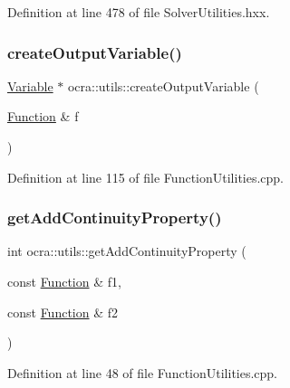 Definition at line 478 of file Solver\+Utilities.\+hxx.

\hypertarget{namespaceocra_1_1utils_ab8a4ac5aa3bfae2c0732c7abd21a84c9}{}\label{namespaceocra_1_1utils_ab8a4ac5aa3bfae2c0732c7abd21a84c9} 
\subsubsection{\texorpdfstring{create\+Output\+Variable()}{createOutputVariable()}}
{\footnotesize\ttfamily \hyperlink{classocra_1_1Variable}{Variable} $\ast$ ocra\+::utils\+::create\+Output\+Variable (\begin{DoxyParamCaption}\item[{\hyperlink{classocra_1_1Function}{Function} \&}]{f }\end{DoxyParamCaption})}



Definition at line 115 of file Function\+Utilities.\+cpp.

\hypertarget{namespaceocra_1_1utils_a176daae05084971fbcba56c06170cb25}{}\label{namespaceocra_1_1utils_a176daae05084971fbcba56c06170cb25} 
\subsubsection{\texorpdfstring{get\+Add\+Continuity\+Property()}{getAddContinuityProperty()}}
{\footnotesize\ttfamily int ocra\+::utils\+::get\+Add\+Continuity\+Property (\begin{DoxyParamCaption}\item[{const \hyperlink{classocra_1_1Function}{Function} \&}]{f1,  }\item[{const \hyperlink{classocra_1_1Function}{Function} \&}]{f2 }\end{DoxyParamCaption})}



Definition at line 48 of file Function\+Utilities.\+cpp.

\hypertarget{namespaceocra_1_1utils_a71c5c6a8257c9a5bc5cc84e9a4fc2e68}{}\label{namespaceocra_1_1utils_a71c5c6a8257c9a5bc5cc84e9a4fc2e68} 
